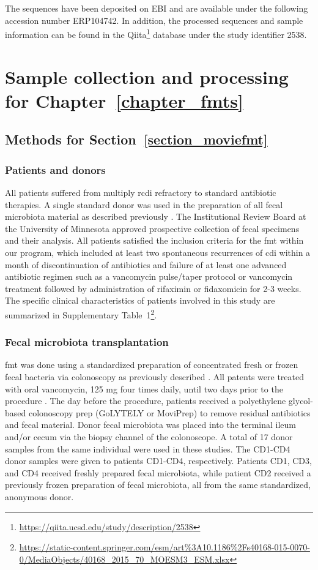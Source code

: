 The sequences have been deposited on EBI and are available under the following
accession number ERP104742.  In addition, the processed sequences and sample
information can be found in the
Qiita\footnote{\url{https://qiita.ucsd.edu/study/description/2538}} database
under the study identifier 2538.

\chapter{Sample collection and processing for 
Chapter~\ref{chapter_fmts}}\label{appendix_fmts}

\section{Methods for Section~\ref{section_moviefmt}}\label{appendix_moviefmt}

\subsection{Patients and donors}
All patients suffered from multiply \gls{rcdi} refractory to standard 
antibiotic therapies. A single standard donor was used in the preparation of 
all fecal microbiota material as described previously \cite{RN45}. The 
Institutional Review Board at the University of Minnesota approved prospective 
collection of fecal specimens and their analysis. All patients satisfied the 
inclusion criteria for the \gls{fmt} within our program, which included at 
least two spontaneous recurrences of \gls{cdi} within a month of 
discontinuation of antibiotics and failure of at least one advanced antibiotic 
regimen such as a vancomycin pulse/taper protocol or vancomycin treatment 
followed by administration of rifaximin or fidaxomicin for 2-3 weeks.  The 
specific clinical characteristics of patients involved in this study are 
summarized in Supplementary 
Table~1\footnote{\url{https://static-content.springer.com/esm/art\%3A10.1186\%2Fs40168-015-0070-0/MediaObjects/40168_2015_70_MOESM3_ESM.xlsx}}.  

\subsection{Fecal microbiota transplantation}
\Gls{fmt} was done using a standardized preparation of concentrated fresh or 
frozen fecal bacteria via colonoscopy as previously described \cite{RN45}. All 
patents were treated with oral vancomycin, 125 mg four times daily, until two 
days prior to the procedure \cite{RN45}. The day before the procedure, patients 
received a polyethylene glycol-based colonoscopy prep 
(GoLYTELY\textsuperscript{\textregistered} or 
MoviPrep\textsuperscript{\textregistered}) to remove residual antibiotics and 
fecal material. Donor fecal microbiota was placed into the terminal ileum 
and/or cecum via the biopsy channel of the colonoscope. A total of 17 donor 
samples from the same individual were used in these studies.  The CD1-CD4 donor 
samples were given to patients CD1-CD4, respectively. Patients CD1, CD3, and 
CD4 received freshly prepared fecal microbiota, while patient CD2 received a 
previously frozen preparation of fecal microbiota, all from the same 
standardized, anonymous donor.

